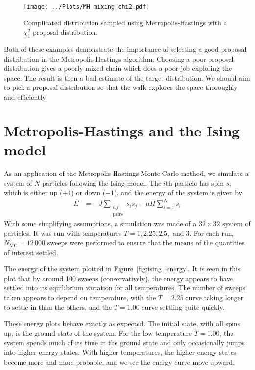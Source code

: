 \documentclass[twocolumn]{myarticle}
\begin{document}
\begin{figure}[ht!]
    \begin{center}
    \texttt{[image: ../Plots/MH\_mixing\_chi2.pdf]}
    \caption{%
        Complicated distribution sampled using Metropolis-Hastings with a $ \chi^2_1 $ proposal distribution.
    }
    \label{fig:mh_mixing_chi2}
    \end{center}
\end{figure}

Both of these examples demonstrate the importance of selecting a good proposal distribution in the Metropolis-Hastings algorithm.
Choosing a poor proposal distribution gives a poorly-mixed chain which does a poor job exploring the space.
The result is then a bad estimate of the target distribution.
We should aim to pick a proposal distribution so that the walk explores the space thoroughly and efficiently.

\section{Metropolis-Hastings and the Ising model}
\label{sec:metropolis_hastings_and_the_ising_model}

As an application of the Metropolis-Hastings Monte Carlo method, we simulate a system of $ N $ particles following the Ising model.
The $ i $th particle has spin $ s_i $ which is either up ($ +1 $) or down ($ -1 $), and the energy of the system is given by
\begin{align}
    E &= -J \sum_{\substack{i,j \\ \text{pairs}}} s_i s_j - \mu H \sum_{i=1}^{N} s_i
\end{align}
With some simplifying assumptions, a simulation was made of a $ 32 \times 32 $ system of particles.
It was run with temperatures $ T = 1, 2.25, 2.5, $ and $ 3 $.
For each run, $ N_\text{MC} = 12\,000 $ sweeps were performed to ensure that the means of the quantities of interest settled.

The energy of the system plotted in Figure~\ref{fig:ising_energy}.
It is seen in this plot that by around 100 sweeps (conservatively), the energy appears to have settled into its equilibrium variation for all temperatures.
The number of sweeps taken appears to depend on temperature, with the $ T = 2.25 $ curve taking longer to settle in than the others, and the $ T = 1.00 $ curve settling quite quickly.

These energy plots behave exactly as expected.
The initial state, with all spins up, is the ground state of the system.
For the low temperature $ T = 1.00 $, the system spends much of its time in the ground state and only occasionally jumps into higher energy states.
With higher temperatures, the higher energy states become more and more probable, and we see the energy curve move upward.
\end{document}

